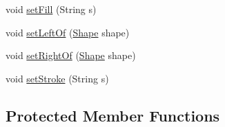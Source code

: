 \begin{DoxyCompactItemize}
void \hyperlink{classcom_1_1aarrelaakso_1_1drawl_1_1_shape_a2a2868c85bfbf4d2940d929950001b3d}{set\+Fill} (String s)
\item 
void \hyperlink{classcom_1_1aarrelaakso_1_1drawl_1_1_shape_aad14fa860ab74cfa90815f56cf4c3ecf}{set\+Left\+Of} (\hyperlink{classcom_1_1aarrelaakso_1_1drawl_1_1_shape}{Shape} shape)
\item 
void \hyperlink{classcom_1_1aarrelaakso_1_1drawl_1_1_shape_a09e1586ce85c1d964cc3b7ce94bc5d4c}{set\+Right\+Of} (\hyperlink{classcom_1_1aarrelaakso_1_1drawl_1_1_shape}{Shape} shape)
\item 
void \hyperlink{classcom_1_1aarrelaakso_1_1drawl_1_1_shape_a3930f6fe72f6c5e0c0aa4c25ffbf18ff}{set\+Stroke} (String s)
\end{DoxyCompactItemize}
\subsection*{Protected Member Functions}
